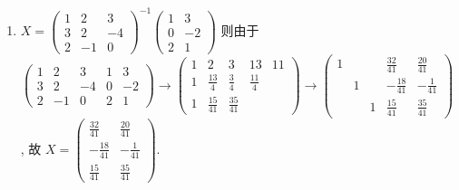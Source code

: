 \begin{enumerate}
			 \item %
			       $X = \begin{pmatrix}
					       1 & 2  & 3  \\
					       3 & 2  & -4 \\
					       2 & -1 & 0
				       \end{pmatrix}^{-1}
				       \begin{pmatrix}
					       1 & 3  \\
					       0 & -2 \\
					       2 & 1
				       \end{pmatrix}$ 则由于
			       $\begin{pmatrix}
					       1 & 2  & 3  & 1 & 3  \\
					       3 & 2  & -4 & 0 & -2 \\
					       2 & -1 & 0  & 2 & 1
				       \end{pmatrix} \to \begin{pmatrix}
					       1 & 2             & 3             & 13           & 11 \\
					       1 & \frac{13}{4}  & \frac{3}{4}   & \frac{11}{4}      \\
					       1 & \frac{15}{41} & \frac{35}{41}
				       \end{pmatrix} \to \begin{pmatrix}
					       1 &   &   & \frac{32}{41}  & \frac{20}{41} \\
					         & 1 &   & -\frac{18}{41} & -\frac{1}{41} \\
					         &   & 1 & \frac{15}{41}  & \frac{35}{41}
				       \end{pmatrix}$,
			       故 $X = \begin{pmatrix}
					       \frac{32}{41}  & \frac{20}{41} \\
					       -\frac{18}{41} & -\frac{1}{41} \\
					       \frac{15}{41}  & \frac{35}{41}
				       \end{pmatrix}$.
		 \end{enumerate}


